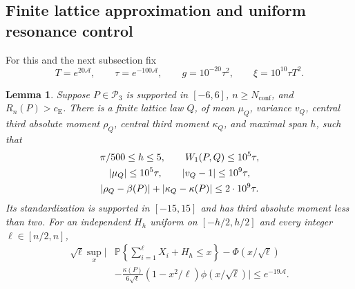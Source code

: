 \documentclass[aop]{imsart}
\theoremstyle{plain}
\newtheorem{lemma}[theorem]{Lemma}
\theoremstyle{definition}
\theoremstyle{definition}
\newcommand{\PP}{\mathbb P}
\newcommand{\Pthree}{\mathcal P_3}
\newcommand{\ce}{c_{\mathrm E}}
\begin{document}
\subsection{Finite lattice approximation and uniform resonance control}

For this and the next subsection fix
\begin{equation}\label{eq:effective-global-parameters}
 T=e^{20\mathcal A},\qquad \tau=e^{-100\mathcal A},\qquad
 g=10^{-20}\tau^2,\qquad \xi=10^{10}\tau T^2.
\end{equation}

\begin{lemma}\label{lem:effective-global-jitter}
Suppose $P\in\Pthree$ is supported in $[-6,6]$,
$n\ge N_{\mathrm{conf}}$, and $R_n(P)>\ce$.
There is a finite lattice law $Q$, of mean $\mu_Q$, variance $v_Q$,
central third absolute moment $\rho_Q$, central third moment $\kappa_Q$,
and maximal span $h$, such that
\begin{gather}
 \pi/500\le h\le5,\qquad W_1(P,Q)\le10^5\tau,\notag\\
 |\mu_Q|\le10^5\tau,\qquad |v_Q-1|\le10^9\tau,\label{eq:effective-rounded-moments}\\
 |\rho_Q-\beta(P)|+|\kappa_Q-\kappa(P)|\le2\cdot10^9\tau.\notag
\end{gather}
Its standardization is supported in $[-15,15]$ and has third
absolute moment less than two.
For an independent $H_h$ uniform on $[-h/2,h/2]$ and every integer
$\ell\in[n/2,n]$,
\begin{equation}\label{eq:effective-global-jitter}
\begin{split}
 \sqrt\ell\sup_x\Bigg|
 &\PP\left\{\sum_{i=1}^{\ell}X_i+H_h\le x\right\}
 -\Phi(x/\sqrt\ell)\\
 &-\frac{\kappa(P)}{6\sqrt\ell}
       (1-x^2/\ell)\phi(x/\sqrt\ell)
 \Bigg|\le e^{-19\mathcal A}.
\end{split}
\end{equation}
\end{lemma}
\end{document}
